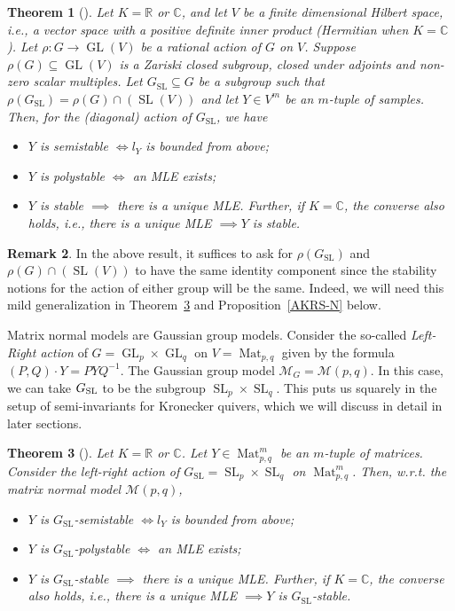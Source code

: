 \documentclass[11pt]{amsart}
\newtheorem{theorem}{Theorem}[section]
\theoremstyle{definition}
\newtheorem{remark}[theorem]{Remark}
\newcommand{\R}{{\mathbb R}}
\newcommand{\C}{{\mathbb C}}
\newcommand{\Mat}{\operatorname{Mat}}
\newcommand{\GL}{\operatorname{GL}}
\newcommand{\SL}{\operatorname{SL}}
\begin{document}
\begin{theorem} [\cite{AKRS}] \label{theo:AKRS}
Let $K = \R$ or $\C$, and let $V$ be a finite dimensional Hilbert space, i.e., a vector space with a positive definite inner product (Hermitian when $K = \C$). Let $\rho:G \rightarrow \GL(V)$ be a rational action of $G$ on $V$.  Suppose $\rho(G) \subseteq \GL(V)$ is a Zariski closed subgroup, closed under adjoints and non-zero scalar multiples. Let $G_{\SL} \subseteq G$ be a subgroup such that $\rho(G_{\SL}) = \rho(G) \cap (\SL(V))$ and let $Y \in V^m$ be an $m$-tuple of samples. Then, for the (diagonal) action of $G_{\SL}$, we have
\begin{itemize}
\item  $Y$ is semistable $\Longleftrightarrow l_Y$ is bounded from above; 
\item $Y$ is polystable $\Longleftrightarrow$ an MLE exists;
\item $Y$ is stable $\implies$ there is a unique MLE. Further, if $K = \C$, the converse also holds, i.e., there is a unique MLE $\implies Y$ is stable.
\end{itemize}
\end{theorem}


\begin{remark}
In the above result, it suffices to ask for $\rho(G_{\SL})$ and $\rho(G) \cap (\SL(V))$ to have the same identity component since the stability notions for the action of either group will be the same. Indeed, we will need this mild generalization in Theorem~\ref{theo:AKRS-LR} and Proposition~\ref{AKRS-N} below.
\end{remark}


Matrix normal models are Gaussian group models. Consider the so-called {\em Left-Right action} of $G = \GL_p \times \GL_q$ on $V = \Mat_{p,q}$ given by the formula $(P,Q) \cdot Y = PYQ^{-1}$. The Gaussian group model $\mathcal{M}_G = \mathcal{M}(p,q)$. In this case, we can take $G_{\rm SL}$ to be the subgroup $\SL_p \times \SL_q$. This puts us squarely in the setup of semi-invariants for Kronecker quivers, which we will discuss in detail in later sections.

\begin{theorem} [\cite{AKRS}] \label{theo:AKRS-LR}
Let $K = \R$ or $\C$. Let $Y \in \Mat_{p,q}^m$ be an $m$-tuple of matrices. Consider the left-right action of $G_{\SL} = \SL_p \times \SL_q$ on $\Mat_{p,q}^m$. Then, w.r.t. the matrix normal model $\mathcal{M}(p,q)$,
\begin{itemize}
\item  $Y$ is $G_{\SL}$-semistable $\Longleftrightarrow l_Y$ is bounded from above; 
\item $Y$ is $G_{\SL}$-polystable $\Longleftrightarrow$  an MLE exists;
\item $Y$ is $G_{\SL}$-stable $\implies$ there is a unique MLE. Further, if $K = \C$, the converse also holds, i.e., there is a unique MLE $\implies Y$ is $G_{\SL}$-stable.
\end{itemize}
\end{theorem}
\end{document}
